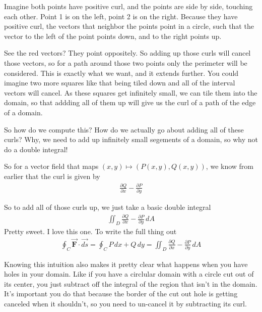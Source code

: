 \documentclass[12pt, letterpaper]{article}
\begin{document}
Imagine both points have positive curl, and the points are side by side, touching each other.
Point 1 is on the left, point 2 is on the right.
Because they have positive curl, the vectors that neighbor the points point in a circle, such that the vector to the left of the point points down, and to the right points up.
\begin{figure}[!h]
    \centering
\end{figure}

See the red vectors?
They point oppositely.
So adding up those curls will cancel those vectors, so for a path around those two points only the perimeter will be considered.
This is exactly what we want, and it extends further.
You could imagine two more squares like that being tiled down and all of the interval vectors will cancel.
As these squares get infinitely small, we can tile them into the domain, so that addding all of them up will give us the curl of a path of the edge of a domain.

So how do we compute this?
How do we actually go about adding all of these curls?
Why, we need to add up infinitely small segements of a domain, so why not do a double integral!

So for a vector field that maps $(x, y) \mapsto (P(x, y), Q(x, y))$, we know from earlier that the curl is given by
\begin{gather*}
    \frac{\partial Q}{\partial x} - \frac{\partial P}{\partial y}
\end{gather*}

So to add all of those curls up, we just take a basic double integral
\begin{gather*}
    \iint_D \frac{\partial Q}{\partial x} - \frac{\partial P}{\partial y}\, dA
\end{gather*}
Pretty sweet. I love this one.
To write the full thing out
\begin{gather*}
    \oint_C \vec{\textbf{F}} \cdot \vec{ds} = \oint_C P\,dx + Q\,dy = \iint_D \frac{\partial Q}{\partial x} - \frac{\partial P}{\partial y}\, dA
\end{gather*}

Knowing this intuition also makes it pretty clear what happens when you have holes in your domain.
Like if you have a circlular domain with a circle cut out of its center, you just subtract off the integral of the region that isn't in the domain.
It's important you do that because the border of the cut out hole is getting canceled when it shouldn't, so you need to un-cancel it by subtracting its curl.
\end{document}
